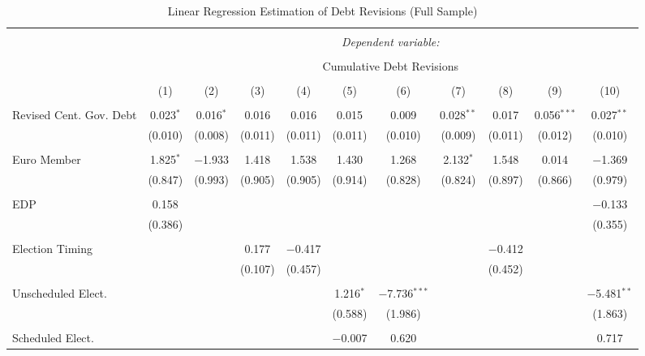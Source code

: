 
\begin{table}[!htbp] \centering 
  \caption{Linear Regression Estimation of Debt Revisions (Full Sample)} 
  \label{debt_results} 
\tiny 
\begin{tabular}{@{\extracolsep{5pt}}lcccccccccc} 
\\[-1.8ex]\hline 
\hline \\[-1.8ex] 
 & \multicolumn{10}{c}{\textit{Dependent variable:}} \\ 
\cline{2-11} 
\\[-1.8ex] & \multicolumn{10}{c}{Cumulative Debt Revisions} \\ 
\\[-1.8ex] & (1) & (2) & (3) & (4) & (5) & (6) & (7) & (8) & (9) & (10)\\ 
\hline \\[-1.8ex] 
 Revised Cent. Gov. Debt & 0.023$^{*}$ & 0.016$^{*}$ & 0.016 & 0.016 & 0.015 & 0.009 & 0.028$^{**}$ & 0.017 & 0.056$^{***}$ & 0.027$^{**}$ \\ 
  & (0.010) & (0.008) & (0.011) & (0.011) & (0.011) & (0.010) & (0.009) & (0.011) & (0.012) & (0.010) \\ 
  & & & & & & & & & & \\ 
 Euro Member & 1.825$^{*}$ & $-$1.933 & 1.418 & 1.538 & 1.430 & 1.268 & 2.132$^{*}$ & 1.548 & 0.014 & $-$1.369 \\ 
  & (0.847) & (0.993) & (0.905) & (0.905) & (0.914) & (0.828) & (0.824) & (0.897) & (0.866) & (0.979) \\ 
  & & & & & & & & & & \\ 
 EDP & 0.158 &  &  &  &  &  &  &  &  & $-$0.133 \\ 
  & (0.386) &  &  &  &  &  &  &  &  & (0.355) \\ 
  & & & & & & & & & & \\ 
 Election Timing &  &  & 0.177 & $-$0.417 &  &  &  & $-$0.412 &  &  \\ 
  &  &  & (0.107) & (0.457) &  &  &  & (0.452) &  &  \\ 
  & & & & & & & & & & \\ 
 Unscheduled Elect. &  &  &  &  & 1.216$^{*}$ & $-$7.736$^{***}$ &  &  &  & $-$5.481$^{**}$ \\ 
  &  &  &  &  & (0.588) & (1.986) &  &  &  & (1.863) \\ 
  & & & & & & & & & & \\ 
 Scheduled Elect. &  &  &  &  & $-$0.007 & 0.620 &  &  &  & 0.717 \\ 

\end{tabular}
\end{table}
